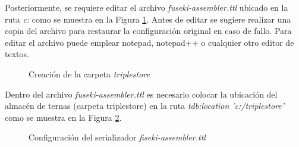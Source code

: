 Posteriormente, se requiere editar el archivo \textit{fuseki-assembler.ttl} ubicado en la ruta \textit{c:\DSpace\config\modules\rdf} como se muestra en la Figura \ref{configuracion-apache-jena-fiseki}. Antes de editar se sugiere realizar una copia del archivo para restaurar la configuración original en caso de fallo. Para editar el archivo puede emplear notepad, notepad++ o cualquier otro editor de textos.\newline

\begin{figure}[!ht]
	\centering
    \caption{Creación de la carpeta \textit{triplestore}}
    \label{configuracion-apache-jena-fiseki}
\end{figure}

Dentro del archivo \textit{fuseki-assembler.ttl} es necesario colocar la ubicación del almacén de ternas (carpeta triplestore) en la ruta \textit{tdb:location 'c:/triplestore'} como se muestra en la Figura \ref{configuracion-serializador-jena-fiseki}.

\begin{figure}[!ht]
	\centering
    \caption{Configuración del serializador \textit{fiseki-assembler.ttl}}
    \label{configuracion-serializador-jena-fiseki}
\end{figure}

